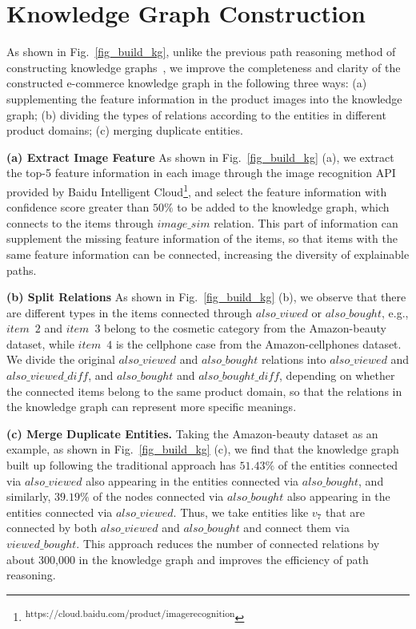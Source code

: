 \documentclass[10pt,journal,compsoc]{IEEEtran}
\begin{document}
\section{Knowledge Graph Construction}
As shown in Fig.~\ref{fig_build_kg}, unlike the previous path reasoning method of constructing knowledge graphs~\cite{rl_pgpr,rs_reks}, we improve the completeness and clarity of the constructed e-commerce knowledge graph in the following three ways: (a) supplementing the feature information in the product images into the knowledge graph; (b) dividing the types of relations according to the entities in different product domains; (c) merging duplicate entities.

\textbf{(a) Extract Image Feature} \quad As shown in Fig.~\ref{fig_build_kg} (a), we extract the top-5 feature information in each image through the image recognition API provided by Baidu Intelligent Cloud\footnote{\textsuperscript{https://cloud.baidu.com/product/imagerecognition}}, and select the feature information with confidence score greater than $50\%$ to be added to the knowledge graph, which connects to the items through $image\_sim$ relation. This part of information can supplement the missing feature information of the items, so that items with the same feature information can be connected, increasing the diversity of explainable paths.

\textbf{(b) Split Relations} \quad As shown in Fig.~\ref{fig_build_kg} (b), we observe that there are different types in the items connected through $also\_viwed$ or $also\_bought$, e.g., $item\enspace2$ and $item\enspace3$ belong to the cosmetic category from the Amazon-beauty dataset, while $item\enspace4$ is the cellphone case from the Amazon-cellphones dataset. We divide the original $also\_viewed$ and $also\_bought$ relations into $also\_viewed$ and $also\_viewed\_diff$, and $also\_bought$ and $also\_bought\_diff$, depending on whether the connected items belong to the same product domain, so that the relations in the knowledge graph can represent more specific meanings.

\textbf{(c) Merge Duplicate Entities.} \quad  Taking the Amazon-beauty dataset as an example, as shown in Fig.~\ref{fig_build_kg} (c), we find that the knowledge graph built up following the traditional approach has $51.43\%$ of the entities connected via $also\_viewed$ also appearing in the entities connected via $also\_bought$, and similarly, $39.19\%$ of the nodes connected via $also\_bought$ also appearing in the entities connected via $also\_viewed$. Thus, we take entities like $v_7$ that are connected by both $also\_viewed$ and $also\_bought$ and connect them via $viewed\_bought$. This approach reduces the number of connected relations by about 300,000 in the knowledge graph and improves the efficiency of path reasoning.
\end{document}
